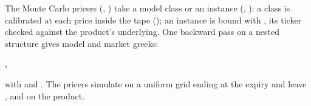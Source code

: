 The Monte Carlo pricers (, ) take a model class or an instance
(, ): a class is calibrated at each price inside the tape (); an
instance is bound with , its ticker checked against the product's underlying. One backward pass
on a nested structure gives model and market greeks:
\begin{center}
  ,
\end{center}
with  and . The pricers
simulate on a uniform grid ending at the expiry and leave ,  and
 on the product. 

